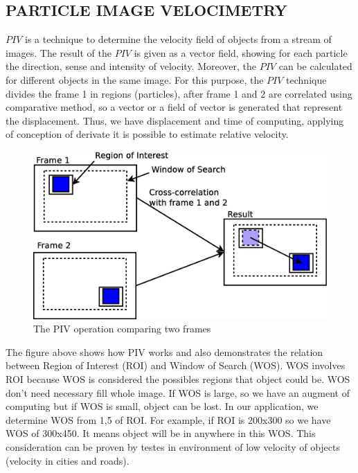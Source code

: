 
\subsection{PARTICLE IMAGE VELOCIMETRY}

$PIV$ is a technique to determine the  velocity field of objects from a stream of images\cite{Bastiaans}.
The result of the $PIV$ is given as a vector field, showing for each particle the direction, sense and intensity of velocity. 
Moreover, the $PIV$ can be calculated for different objects in the same image.
For this purpose, the $PIV$ technique divides the frame 1 in regions (particles), after frame 1 and 2 are correlated 
using comparative method, so a vector or a field of vector is generated that represent the displacement. Thus, we have 
displacement and time of computing, applying of conception of derivate it is possible to estimate relative velocity.

\begin{figure}[H]
\includegraphics[width=\columnwidth]{images/explanationPIV.eps}
\caption{The PIV operation comparing two frames}
\label{fig:system}
\end{figure}

The figure above shows how PIV works and also demonstrates the relation between Region of Interest (ROI) and 
Window of Search (WOS). WOS involves ROI because WOS is considered the possibles regions that object could be. 
WOS don't need necessary fill whole image. If WOS is large, so we have an augment of computing but 
if WOS is small, object can be lost. In our application, we determine WOS from 1,5 of ROI. For example, 
if ROI is 200x300 so we have WOS of 300x450. It means object will be in anywhere in this WOS. This consideration can be
proven by testes in environment of low velocity of objects (velocity in cities and roads).

